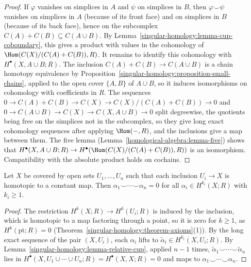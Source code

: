 \begin{proof}
If $\varphi$ vanishes on simplices in $A$ and $\psi$ on simplices in $B$, then $\varphi \smile \psi$ vanishes on simplices in $A$ (because of its front face) and on simplices in $B$ (because of its back face),
hence on the subcomplex $C(A) + C(B) \subseteq C(A \cup B)$. By Lemma~\ref{singular-homology:lemma-cup-coboundary}, this gives a product with values in the cohomology of
$\Hom(C(X)/(C(A) + C(B)), R)$. It remains to identify this cohomology with $H^\bullet(X, A \cup B; R)$. The inclusion $C(A) + C(B) \to C(A \cup B)$ is a chain homotopy equivalence by
Proposition~\ref{singular-homology:proposition-small-chains}, applied to the open cover $\{A, B\}$ of $A \cup B$, so it induces isomorphisms on cohomology with coefficients in $R$. The sequences
$0 \to C(A) + C(B) \to C(X) \to C(X)/(C(A) + C(B)) \to 0$ and $0 \to C(A \cup B) \to C(X) \to C(X, A \cup B) \to 0$ split degreewise, the quotients being free on the simplices not in the subcomplex, so
they give long exact cohomology sequences after applying $\Hom(-, R)$, and the inclusions give a map between them. The five lemma (Lemma~\ref{homological-algebra:lemma-five}) shows that
$H^\bullet(X, A \cup B; R) \to H^\bullet(\Hom(C(X)/(C(A) + C(B)), R))$ is an isomorphism. Compatibility with the absolute product holds on cochains.
\end{proof}

\begin{proposition}\label{singular-homology:proposition-lusternik-schnirelmann}
Let $X$ be covered by open sets $U_1, \ldots, U_n$ such that each inclusion $U_i \to X$ is homotopic to a constant map. Then $\alpha_1 \smile \cdots \smile \alpha_n = 0$ for all
$\alpha_i \in H^{k_i}(X; R)$ with $k_i \geq 1$.
\end{proposition}

\begin{proof}
The restriction $H^{k}(X; R) \to H^{k}(U_i; R)$ is induced by the inclusion, which is homotopic to a map factoring through a point, so it is zero for $k \geq 1$, as $H^k(\mathrm{pt}; R) = 0$
(Theorem~\ref{singular-homology:theorem-axioms}(1)). By the long exact sequence of the pair $(X, U_i)$, each $\alpha_i$ lifts to $\tilde\alpha_i \in H^{k_i}(X, U_i; R)$. By
Lemma~\ref{singular-homology:lemma-relative-cup}, applied $n - 1$ times, $\tilde\alpha_1 \smile \cdots \smile \tilde\alpha_n$ lies in $H^\bullet(X, U_1 \cup \cdots \cup U_n; R) = H^\bullet(X, X; R) = 0$ and
maps to $\alpha_1 \smile \cdots \smile \alpha_n$.
\end{proof}

